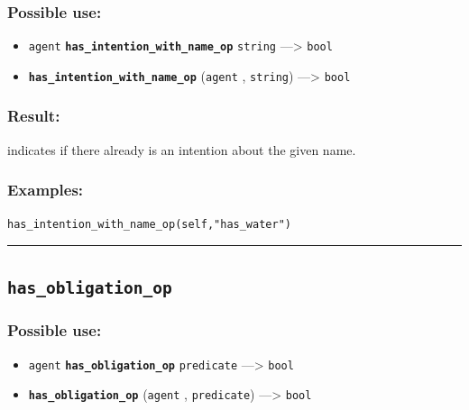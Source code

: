 \documentclass[]{book}
\providecommand{\tightlist}{%
  \setlength{\itemsep}{0pt}\setlength{\parskip}{0pt}}
\theoremstyle{definition}
\theoremstyle{definition}
\theoremstyle{definition}
\theoremstyle{remark}
\begin{document}
\subsubsection{Possible use:}\label{possible-use-253}

\begin{itemize}
\tightlist
\item
  \texttt{agent} \textbf{\texttt{has\_intention\_with\_name\_op}}
  \texttt{string} ---\textgreater{} \texttt{bool}
\item
  \textbf{\texttt{has\_intention\_with\_name\_op}} (\texttt{agent} ,
  \texttt{string}) ---\textgreater{} \texttt{bool}
\end{itemize}

\subsubsection{Result:}\label{result-244}

indicates if there already is an intention about the given name.

\subsubsection{Examples:}\label{examples-193}

\begin{verbatim}
has_intention_with_name_op(self,"has_water") 
\end{verbatim}

\begin{center}\rule{0.5\linewidth}{\linethickness}\end{center}

\subsection{\texorpdfstring{\texttt{has\_obligation\_op}}{has\_obligation\_op}}\label{has_obligation_op}

\subsubsection{Possible use:}\label{possible-use-254}

\begin{itemize}
\tightlist
\item
  \texttt{agent} \textbf{\texttt{has\_obligation\_op}}
  \texttt{predicate} ---\textgreater{} \texttt{bool}
\item
  \textbf{\texttt{has\_obligation\_op}} (\texttt{agent} ,
  \texttt{predicate}) ---\textgreater{} \texttt{bool}
\end{itemize}
\end{document}
